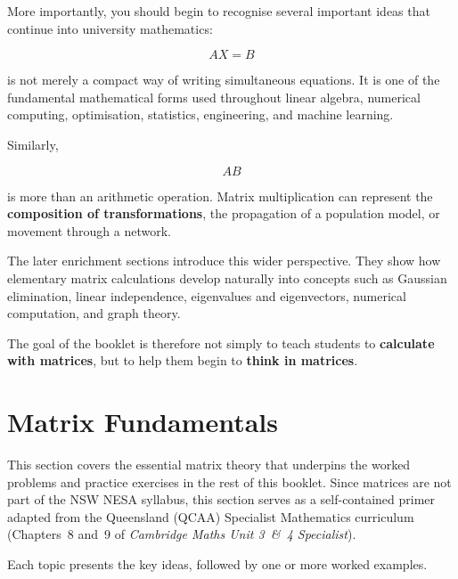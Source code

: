 \documentclass[12pt]{article}
\begin{document}
More importantly, you should begin to recognise several important ideas that continue into university mathematics:

\[
AX=B
\]

is not merely a compact way of writing simultaneous equations. It is one of the fundamental mathematical forms used throughout linear algebra, numerical computing, optimisation, statistics, engineering, and machine learning.

Similarly,

\[
AB
\]

is more than an arithmetic operation. Matrix multiplication can represent the \textbf{composition of transformations}, the propagation of a population model, or movement through a network.

The later enrichment sections introduce this wider perspective. They show how elementary matrix calculations develop naturally into concepts such as Gaussian elimination, linear independence, eigenvalues and eigenvectors, numerical computation, and graph theory.

The goal of the booklet is therefore not simply to teach students to \textbf{calculate with matrices}, but to help them begin to \textbf{think in matrices}.

\section{Matrix Fundamentals}

This section covers the essential matrix theory that underpins the worked problems and practice exercises in the rest of this booklet. Since matrices are not part of the NSW NESA syllabus, this section serves as a self-contained primer adapted from the Queensland (QCAA) Specialist Mathematics curriculum (Chapters~8 and~9 of \emph{Cambridge Maths Unit 3~\&~4 Specialist}).

Each topic presents the key ideas, followed by one or more worked examples.













\end{document}

